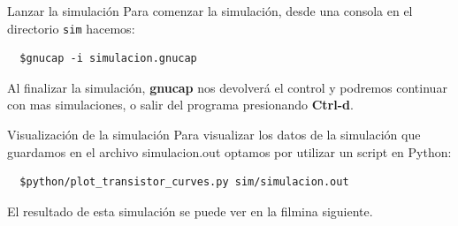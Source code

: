 \documentclass{beamer}
\begin{document}
\begin{frame}[fragile]{Lanzar la simulación}
  Para comenzar la simulación, desde una consola en el directorio \verb.sim. hacemos:
  \begin{verbatim}
  $gnucap -i simulacion.gnucap
  \end{verbatim}

  Al finalizar la simulación, \textbf{gnucap} nos devolverá el control y podremos continuar con mas simulaciones, o salir del programa presionando \textbf{Ctrl-d}. 
\end{frame}
\begin{frame}[fragile]{Visualización de la simulación}
  Para visualizar los datos de la simulación que guardamos en el archivo simulacion.out optamos por utilizar un script en Python:
  \begin{verbatim}
  $python/plot_transistor_curves.py sim/simulacion.out
  \end{verbatim}

  El resultado de esta simulación se puede ver en la filmina siguiente.

\end{frame}
 
\end{document}
